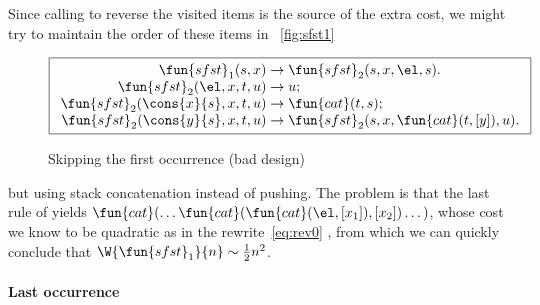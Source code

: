 Since calling  to reverse the
visited items is the source of the extra cost, we might try to
maintain the order of these items in \fig~\vref{fig:sfst1}
\begin{figure}[b]
\begin{equation*}
\boxed{%
\begin{array}{r@{\;}l@{\;}l}
\fun{sfst}_1(s,x)               & \rightarrow
                                & \fun{sfst}_2(s,x,\el,s).\\
\fun{sfst}_2(\el,x,t,u)         & \rightarrow & u;\\
\fun{sfst}_2(\cons{x}{s},x,t,u) & \rightarrow & \fun{cat}(t,s);\\
\fun{sfst}_2(\cons{y}{s},x,t,u) & \rightarrow
                                & \fun{sfst}_2(s,x,\fun{cat}(t,[y]),u).
\end{array}}
\end{equation*}
\caption{Skipping the first occurrence (bad design)}
\label{fig:sfst1}
\end{figure}
but using stack concatenation instead of pushing. The problem is that
the last rule of 
 yields
\(\fun{cat}(\dots\fun{cat}(\fun{cat}(\el,[x_1]),[x_2])\dots)\), whose
cost we know to be quadratic  as in the
rewrite~\eqref{eq:rev0}
, from which we can
quickly conclude that \(\W{\fun{sfst}_1}{n} \sim \tfrac{1}{2}n^2\).

\paragraph{Last occurrence}

